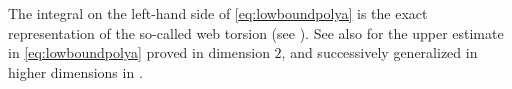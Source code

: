 \documentclass[oneside,a4paper,11pt,notitlepage]{article}
\newcommand{\abs}[1]{{\left|#1\right|}}
\theoremstyle{definition}
\theoremstyle{plain}
\newtheorem{lemma}[teorema]{Lemma}
\theoremstyle{definition}
\begin{document}
The integral on the left-hand side of \eqref{eq:lowboundpolya} is the exact representation of the so-called web torsion (see \cite{PS}). See also \cite{CFG2002} for the upper estimate in \eqref{eq:lowboundpolya} proved in dimension $2$, and successively generalized in higher dimensions in \cite{Cra2004}.

\end{document}
